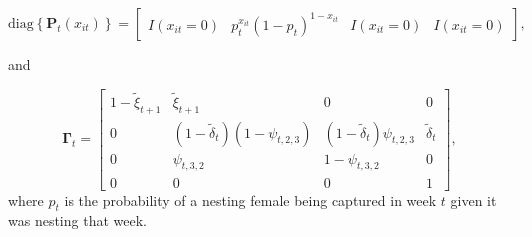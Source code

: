 \documentclass[12pt]{article}
\newcommand{\bP}{\ensuremath{\mathbf{P}}}
\newcommand{\bG}{\ensuremath{\boldsymbol{\Gamma}}}
\begin{document}
\[
\text{diag}\left\{\bP_t(x_{it})\right\} = \left[\begin{array}{cccc}
I(x_{it}=0) & p_t^{x_{it}}(1-p_t)^{1-x_{it}} & I(x_{it}=0) & I(x_{it}=0)
\end{array}\right],
\]

\centerline{and}

\[
\bG_t = \left[\begin{array}{cccc}
1-\tilde{\xi}_{t+1} & \tilde{\xi}_{t+1} & 0 & 0 \\
0 & (1-\tilde{\delta}_t)(1-\psi_{t,2,3}) &  (1-\tilde{\delta}_t)\psi_{t,2,3} & \tilde{\delta}_t \\
0 & \psi_{t,3,2} &  1-\psi_{t,3,2} & 0 \\
0 & 0 & 0 & 1
\end{array}
\right],
\] 
where $p_t$ is the probability of a nesting female being captured in week $t$ given it was nesting that week. 



\clearpage




\end{document}
